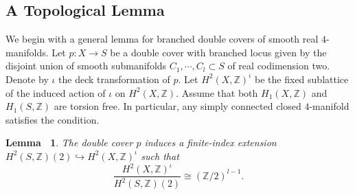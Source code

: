 \documentclass[12pt,reqno,a4paper]{amsart}
\newtheorem{lem}[thm]{Lemma~}
\theoremstyle{remark}
\theoremstyle{definition}
\newcommand{\ZZ}{\mathbb{Z}}
\begin{document}
\subsection{A Topological Lemma}
We begin with a general lemma for branched double covers of smooth real $4$-manifolds.
Let $p\colon X\to S$ be a double cover with branched locus given by the disjoint union of smooth submanifolds $C_1,\cdots,C_l \subset S$ of real codimension two.
Denote by $\iota$ the deck transformation of $p$. 
Let $H^2(X,\ZZ)^\iota$ be the fixed sublattice of the induced action of $\iota$ on $H^2(X,\ZZ)$.
Assume that both $H_1(X,\ZZ)$ and $H_1(S,\ZZ)$ are torsion free.
In particular, any simply connected closed $4$-manifold satisfies the condition.

\begin{lem}
\label{lemma: double cover manifold}
    The double cover $p$ induces a finite-index extension $H^2(S,\ZZ)(2)\hookrightarrow H^2(X,\ZZ)^\iota$ such that
    \begin{equation*}
        \frac{H^2(X,\ZZ)^\iota}{H^2(S,\ZZ)(2)}\cong (\ZZ/2)^{l-1}.
    \end{equation*}
\end{lem}
\end{document}
